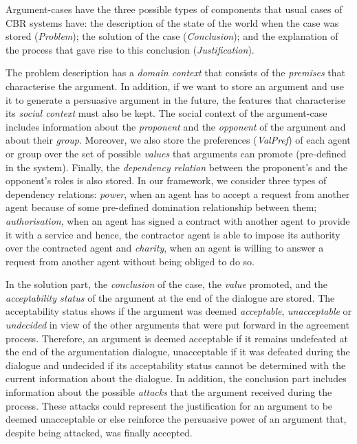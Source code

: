 Argument-cases have the three possible types of components that usual cases of CBR systems have: the description of the state of the world when the case was stored (\emph{Problem}); the solution of the case (\emph{Conclusion}); and the explanation of the process that gave rise to this conclusion (\emph{Justification}).

The problem description has a \emph{domain context} that consists of the \emph{premises} that characterise the argument. In addition, if we want to store an argument and use it to generate a persuasive argument in the future, the features that characterise its \emph{social context} must also be kept. The social context of the argument-case includes information about the \emph{proponent} and the \emph{opponent} of the argument and about their \emph{group}. Moreover, we also store the preferences (\emph{ValPref}) of each agent or group over the set of possible \emph{values} that arguments can promote (pre-defined in the system). Finally, the \emph{dependency relation} between the proponent's and the opponent's roles is also stored. In our framework, we consider three types of dependency relations: \emph{power}, when an agent has to accept a request from another agent because of some pre-defined domination relationship between them; \emph{authorisation}, when an agent has signed a contract with another agent to provide it with a service and hence, the contractor agent is able to impose its authority over the contracted agent and \emph{charity}, when an agent is willing to answer a request from another agent without being obliged to do so.

In the solution part, the \emph{conclusion} of the case, the \emph{value} promoted, and the \emph{acceptability status} of the argument at the end of the dialogue are stored. The acceptability status shows if the argument was deemed \emph{acceptable}, \emph{unacceptable} or \emph{undecided} in view of the other arguments that were put forward in the agreement process. Therefore, an argument is deemed acceptable if it remains undefeated at the end of the argumentation dialogue, unacceptable if it was defeated during the dialogue and undecided if its acceptability status cannot be determined with the current information about the dialogue. %
In addition, the conclusion part includes information about the possible \emph{attacks} that the argument received during the process. These attacks could represent the justification for an argument to be deemed unacceptable or else reinforce the persuasive power of an argument that, despite being attacked, was finally accepted.


